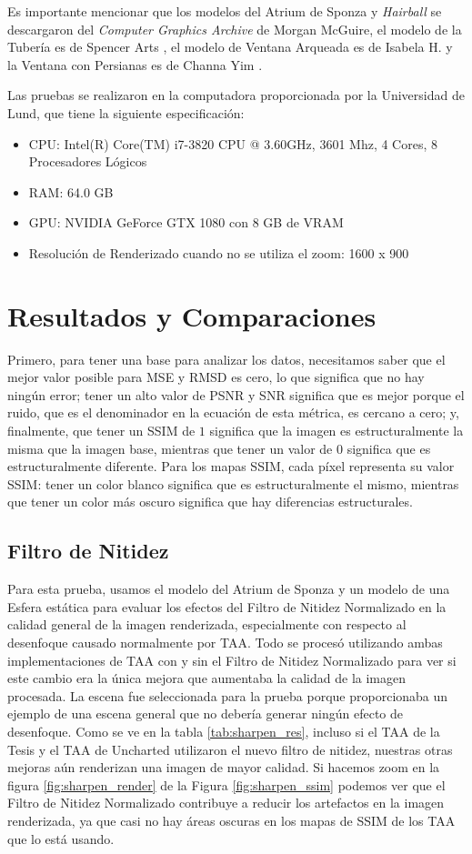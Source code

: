 \documentclass[pregrado]{tesis-usb} %
\begin{document}
Es importante mencionar que los modelos del Atrium de Sponza y \textit{Hairball} se descargaron del \textit{Computer Graphics Archive} \cite{McGuire2017Data} de Morgan McGuire, el modelo de la Tubería es de Spencer Arts \cite{Spencer2010}, el modelo de Ventana Arqueada es de Isabela H. \cite{Isabela2016} y la Ventana con Persianas es de Channa Yim \cite{Channa2015}.

Las pruebas se realizaron en la computadora proporcionada por la Universidad de Lund, que tiene la siguiente especificación:
\begin{itemize}
\setlength\itemsep{0em}
\item CPU: Intel(R) Core(TM) i7-3820 CPU @ 3.60GHz, 3601 Mhz, 4 Cores, 8 Procesadores Lógicos
\item RAM: 64.0 GB	
\item GPU: NVIDIA GeForce GTX 1080 con 8 GB de VRAM
\item Resolución de Renderizado cuando no se utiliza el zoom: 1600 x 900
\end{itemize}

\section{Resultados y Comparaciones}
Primero, para tener una base para analizar los datos, necesitamos saber que el mejor valor posible para MSE y RMSD es cero, lo que significa que no hay ningún error; tener un alto valor de PSNR y SNR significa que es mejor porque el ruido, que es el denominador en la ecuación de esta métrica, es cercano a cero; y, finalmente, que tener un SSIM de $1$ significa que la imagen es estructuralmente la misma que la imagen base, mientras que tener un valor de $0$ significa que es estructuralmente diferente. Para los mapas SSIM, cada píxel representa su valor SSIM: tener un color blanco significa que es estructuralmente el mismo, mientras que tener un color más oscuro significa que hay diferencias estructurales.

\subsection{Filtro de Nitidez}
Para esta prueba, usamos el modelo del Atrium de Sponza y un modelo de una Esfera estática para evaluar los efectos del Filtro de Nitidez Normalizado en la calidad general de la imagen renderizada, especialmente con respecto al desenfoque causado normalmente por TAA. Todo se procesó utilizando ambas implementaciones de TAA con y sin el Filtro de Nitidez Normalizado para ver si este cambio era la única mejora que aumentaba la calidad de la imagen procesada. La escena fue seleccionada para la prueba porque proporcionaba un ejemplo de una escena general que no debería generar ningún efecto de desenfoque. Como se ve en la tabla \ref{tab:sharpen_res}, incluso si el TAA de la Tesis y el TAA de Uncharted utilizaron el nuevo filtro de nitidez, nuestras otras mejoras aún renderizan una imagen de mayor calidad. Si hacemos zoom en la figura \ref{fig:sharpen_render} de la Figura \ref{fig:sharpen_ssim} podemos ver que el Filtro de Nitidez Normalizado contribuye a reducir los artefactos en la imagen renderizada, ya que casi no hay áreas oscuras en los mapas de SSIM de los TAA que lo está usando.
\end{document}
